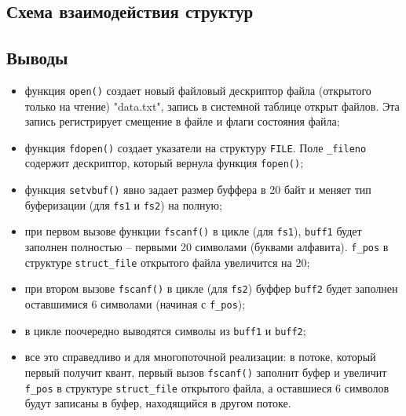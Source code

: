 \subsection{Схема взаимодействия структур}


\subsection*{Выводы}

\begin{itemize}
	\item функция \texttt{open()} создает новый файловый дескриптор файла (открытого только на чтение) "data.txt"{}, запись в системной таблице открыт файлов. Эта запись регистрирует смещение в файле и флаги состояния файла;
	
	\item функция \texttt{fdopen()} создает указатели на структуру \texttt{FILE}. Поле \texttt{\_fileno} содержит дескриптор, который вернула функция \texttt{fopen()};
	
	\item функция \texttt{setvbuf()} явно задает размер буффера в 20 байт и меняет тип буферизации (для \texttt{fs1} и \texttt{fs2}) на полную;
	
	\item при первом вызове функции \texttt{fscanf()} в цикле (для \texttt{fs1}), \texttt{buff1} будет заполнен полностью -- первыми 20 символами (буквами алфавита). \texttt{f\_pos} в структуре \texttt{struct\_file} открытого файла увеличится на 20;
	
	\item при втором вызове \texttt{fscanf()} в цикле (для \texttt{fs2}) буффер \texttt{buff2} будет заполнен оставшимися 6 символами (начиная с \texttt{f\_pos});
	
	\item в цикле поочередно выводятся символы из \texttt{buff1} и \texttt{buff2};
	
	\item все это справедливо и для многопоточной реализации: в потоке, который первый получит квант, первый вызов \texttt{fscanf()} заполнит буфер и увеличит \texttt{f\_pos} в структуре \texttt{struct\_file} открытого файла, а оставшиеся 6 символов будут записаны в буфер, находящийся в другом потоке.
\end{itemize}

\clearpage

